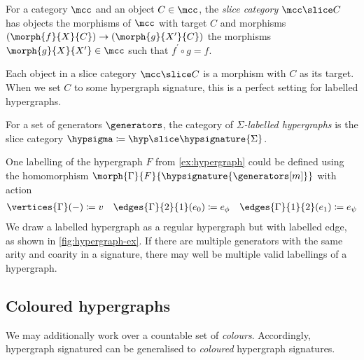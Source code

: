 \begin{definition}\label{def:slice-category}
    For a category \(\mcc\) and an object \(C \in \mcc\), the
    \emph{slice category} \(\mcc \slice C\) has objects the morphisms of
    \(\mcc\) with target \(C\) and morphisms
    \((\morph{f}{X}{C}) \to (\morph{g}{X^\prime}{C})\) the morphisms
    \(\morph{g}{X}{X^\prime} \in \mcc\) such that \(f^\prime\circ g = f\).
\end{definition}

Each object in a slice category \(\mcc \slice C\) is a morphism with \(C\) as
its target.
When we set \(C\) to some hypergraph signature, this is a perfect setting for
labelled hypergraphs.

\begin{definition}
    For a set of generators \(\generators\), the category of
    \emph{\(\Sigma\)-labelled hypergraphs} is the slice category
    \(\hypsigma \coloneqq \hyp \slice \hypsignature{\Sigma}\).
\end{definition}

\begin{example}\label{ex:labelled-hypergraph}
    One labelling of the hypergraph \(F\) from \cref{ex:hypergraph} could be
    defined using the homomorphism
    \(\morph{\Gamma}{F}{\hypsignature{\generators[m]}}\) with action
    \begin{gather*}
        \vertices{\Gamma}(-) \coloneqq v
        \quad
        \edges{\Gamma}{2}{1}(e_0) \coloneqq e_\phi
        \quad
        \edges{\Gamma}{1}{2}(e_1) \coloneqq e_\psi
    \end{gather*}
    We draw a labelled hypergraph as a regular hypergraph but with labelled
    edge, as shown in \cref{fig:hypergraph-ex}.
    If there are multiple generators with the same arity and coarity
    in a signature, there may well be multiple valid labellings of a hypergraph.
\end{example}

\subsection{Coloured hypergraphs}

We may additionally work over a countable set of \emph{colours}.
Accordingly, hypergraph signatured can be generalised to \emph{coloured}
hypergraph signatures.

